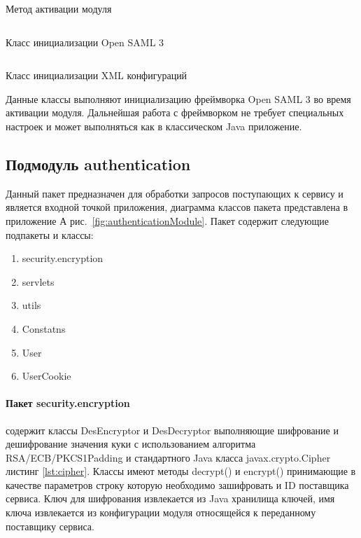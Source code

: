 \begin{longlisting}
\inputminted[linenos,frame=single]{java}{inc/src/Activator}
\caption{Метод активации модуля} 
\label{lst:activator}
\end{longlisting}

\begin{longlisting}
\inputminted[linenos,frame=single]{java}{inc/src/SamlInitializationSupport}
\caption{Класс инициализации Open SAML 3} 
\label{lst:samlInitialization}
\end{longlisting}

\begin{longlisting}
\inputminted[linenos,frame=single]{java}{inc/src/InitializationXMLConfigurator}
\caption{Класс инициализации XML конфигураций} 
\label{lst:xmlConfigurator}
\end{longlisting}

Данные классы выполняют инициализацию фреймворка Open SAML 3 во время активации модуля. Дальнейшая работа с фреймворком не требует специальных настроек и может выполняться как в классическом Java приложение.

\subsection{Подмодуль authentication}
Данный пакет предназначен для обработки запросов поступающих к сервису и является входной точкой приложения, диаграмма классов пакета представлена в приложение А рис.~\ref{fig:authenticationModule}. Пакет содержит следующие подпакеты и классы:
\begin{enumerate}
\item security.encryption
\item servlets
\item utils
\item Constatns
\item User
\item UserCookie
\end{enumerate}

\paragraph{Пакет security.encryption} содержит классы DesEncryptor и DesDecryptor  выполняющие шифрование и дешифрование значения куки с использованием алгоритма RSA/ECB/PKCS1Padding и стандартного Java класса javax.crypto.Cipher листинг \ref{lst:cipher}. Классы имеют методы decrypt() и encrypt() принимающие в качестве параметров строку которую необходимо зашифровать и ID поставщика сервиса. Ключ для шифрования извлекается из Java хранилища ключей, имя ключа извлекается из конфигурации модуля относящейся к переданному поставщику сервиса.

